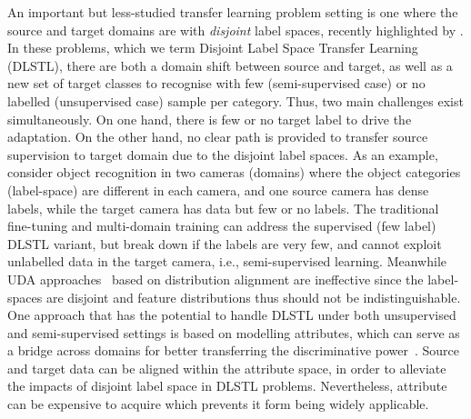 \documentclass[letterpaper]{article} \usepackage{aaai19}  \usepackage{times}  \usepackage{helvet}  \usepackage{courier}  \usepackage{url}  \usepackage{graphicx}
\begin{document}
An important but less-studied transfer learning problem setting is one where the source and target domains are with \emph{disjoint} label spaces,
recently highlighted by \cite{label_eff_open_da_2017}. In these problems, which we term Disjoint Label Space Transfer Learning (DLSTL), there are both a domain shift between source and target, as well as a new set of target classes to recognise with few (semi-supervised case) or no labelled (unsupervised case) sample per category. Thus, two main challenges exist simultaneously. On one hand, there is few or no target label to drive the adaptation. On the other hand, no clear path is provided to transfer source supervision to target domain due to the disjoint label spaces.
As an example, consider object recognition in two cameras (domains) where the object categories (label-space) are different in each camera, and one source camera has dense labels, while the target camera has data but few or no labels.
The traditional fine-tuning \cite{yosinski2014transferable} and multi-domain training \cite{rebuff2017mdl} can address the supervised (few label) DLSTL variant, but break down if the labels are very few, and cannot exploit unlabelled data in the target camera, i.e., semi-supervised learning. 
Meanwhile UDA approaches~\cite{ganin2016domain} based on distribution alignment are ineffective since the label-spaces are disjoint and feature distributions thus should not be indistinguishable.
One approach that has the potential to handle DLSTL under both unsupervised and semi-supervised settings is based on modelling attributes, which can serve as a bridge across domains for better transferring the discriminative power~\cite{chen2015deep,gebru2017fine,attr_label_transfer_2018wang}. Source and target data can be aligned within the attribute space, in order to alleviate the impacts of disjoint label space in DLSTL problems. Nevertheless, attribute can be expensive to acquire which prevents it form being widely applicable.
\end{document}
